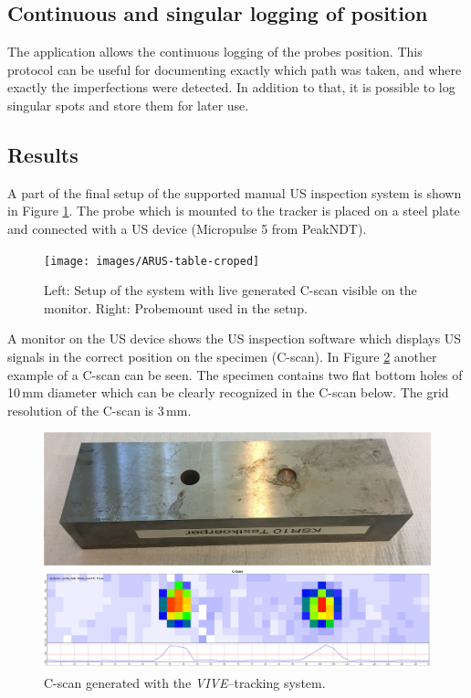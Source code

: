 \documentclass{VRARWorkshop}
\begin{document}
\subsection{Continuous and singular logging of position}
The application allows the continuous logging of the probes position.
This protocol can be useful for documenting exactly which path was taken, and where exactly the imperfections were detected.
In addition to that, it is possible to log singular spots and store them for later use.

\subsection{Results}
A part of the final setup of the supported manual US inspection system is shown in Figure \ref{fig:AR-table}.
The probe which is mounted to the tracker is placed on a steel plate and connected with a US device (Micropulse 5 from PeakNDT).
\begin{figure}[h!]
    \begin{center}
        \texttt{[image: images/ARUS-table-croped]}
        \caption{\label{fig:AR-table} Left: Setup of the system with live generated C-scan visible on the monitor. Right: Probemount used in the setup.}
    \end{center}
\end{figure}
A monitor on the US device shows the US inspection software which displays US signals in the correct position on the specimen (C-scan).
In Figure \ref{fig:resultCScan} another example of a C-scan can be seen.
The specimen contains two flat bottom holes of 10\,mm diameter which can be clearly recognized in the C-scan below.
The grid resolution of the C-scan is 3\,mm.
\begin{figure}[h!]
    \begin{center}
        \includegraphics[width=120mm]{images/CScanARUS}
        \caption{\label{fig:resultCScan} C-scan generated with the \textit{VIVE}--tracking system.}
    \end{center}
\end{figure}
\end{document}
